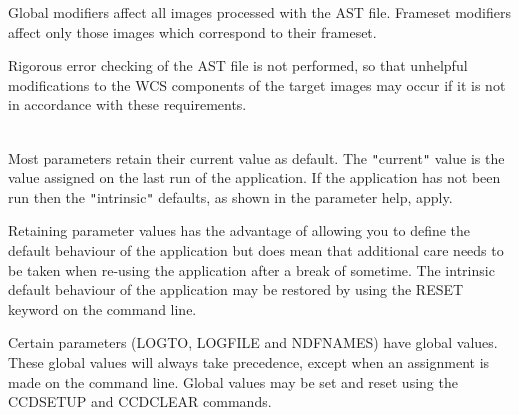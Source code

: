 \documentclass[twoside,11pt]{article}
\newcommand{\htmlref}[2]{#1}
\renewcommand{\_}{\texttt{\symbol{95}}}
\newcommand{\qt}[1]{{\tt "}#1{\tt "}}
\newcommand{\xroutine}[1]{\htmlref{{\sc #1}}{#1}}
\newcommand{\sstdiytopic}[2]{\item[#1:] \mbox{} \\[1.3ex] #2}
\newcommand{\sstdiytopic}[2]{\item[{#1:}] #2 }
\begin{document}
{{            Global modifiers affect all images processed with the AST
            file.  Frameset modifiers affect only those images which
            correspond to their frameset.

         Rigorous error checking of the AST file is not performed, so
         that unhelpful modifications to the WCS components of the
         target images may occur if it is not in accordance with these
         requirements.
   }
   \sstdiytopic{
      Behaviour of parameters
   } {
      Most parameters retain their current value as default. The
      \qt{current} value is the value assigned on the last run of the
      application. If the application has not been run then the
      \qt{intrinsic} defaults, as shown in the parameter help, apply.

      Retaining parameter values has the advantage of allowing you to
      define the default behaviour of the application but does mean
      that additional care needs to be taken when re-using the
      application after a break of sometime. The intrinsic default
      behaviour of the application may be restored by using the RESET
      keyword on the command line.

      Certain parameters (LOGTO, LOGFILE and NDFNAMES) have global
      values. These global values will always take precedence, except
      when an assignment is made on the command line.  Global values may
      be set and reset using the \xroutine{CCDSETUP} and 
      \xroutine{CCDCLEAR} commands.
   }
}
\end{document}
